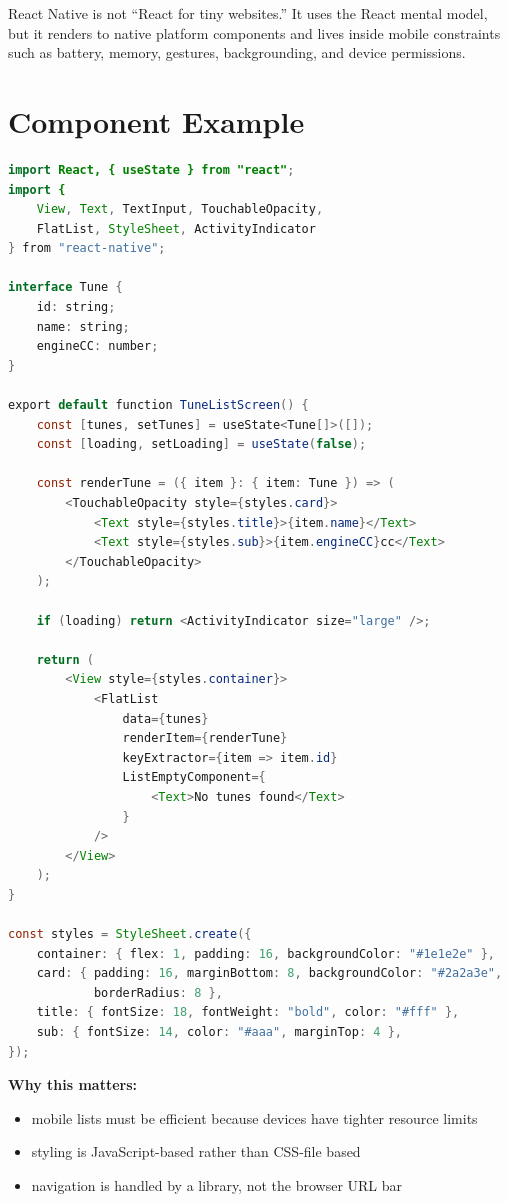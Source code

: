 \documentclass[12pt, a4paper, oneside]{book}
\begin{document}
\begin{intuitionbox}
React Native is not ``React for tiny websites.'' It uses the React mental model, but it renders to native platform components and lives inside mobile constraints such as battery, memory, gestures, backgrounding, and device permissions.
\end{intuitionbox}

\section{Component Example}

\begin{lstlisting}[language=Java, caption={React Native screen}]
import React, { useState } from "react";
import {
    View, Text, TextInput, TouchableOpacity,
    FlatList, StyleSheet, ActivityIndicator
} from "react-native";

interface Tune {
    id: string;
    name: string;
    engineCC: number;
}

export default function TuneListScreen() {
    const [tunes, setTunes] = useState<Tune[]>([]);
    const [loading, setLoading] = useState(false);

    const renderTune = ({ item }: { item: Tune }) => (
        <TouchableOpacity style={styles.card}>
            <Text style={styles.title}>{item.name}</Text>
            <Text style={styles.sub}>{item.engineCC}cc</Text>
        </TouchableOpacity>
    );

    if (loading) return <ActivityIndicator size="large" />;

    return (
        <View style={styles.container}>
            <FlatList
                data={tunes}
                renderItem={renderTune}
                keyExtractor={item => item.id}
                ListEmptyComponent={
                    <Text>No tunes found</Text>
                }
            />
        </View>
    );
}

const styles = StyleSheet.create({
    container: { flex: 1, padding: 16, backgroundColor: "#1e1e2e" },
    card: { padding: 16, marginBottom: 8, backgroundColor: "#2a2a3e",
            borderRadius: 8 },
    title: { fontSize: 18, fontWeight: "bold", color: "#fff" },
    sub: { fontSize: 14, color: "#aaa", marginTop: 4 },
});
\end{lstlisting}

\textbf{Why this matters:}
\begin{itemize}[leftmargin=2em]
    \item mobile lists must be efficient because devices have tighter resource limits
    \item styling is JavaScript-based rather than CSS-file based
    \item navigation is handled by a library, not the browser URL bar
\end{itemize}
\end{document}
